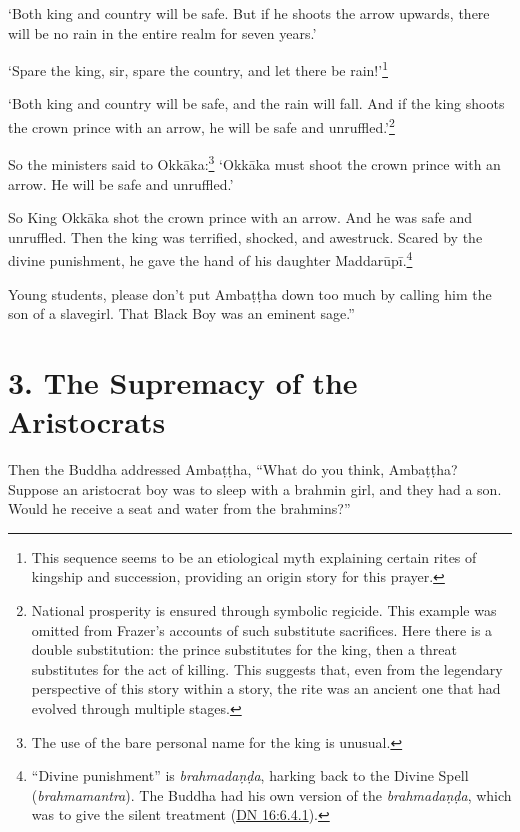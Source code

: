 \documentclass[12pt,openany]{book}%
\begin{document}
‘Both king and country will be safe. But if he shoots the arrow upwards, there will be no rain in the entire realm for seven years.’ 

‘Spare the king, sir, spare the country, and let there be rain!’\footnote{This sequence seems to be an etiological myth explaining certain rites of kingship and succession, providing an origin story for this prayer. } 

‘Both king and country will be safe, and the rain will fall. And if the king shoots the crown prince with an arrow, he will be safe and unruffled.’\footnote{National prosperity is ensured through symbolic regicide. This example was omitted from Frazer’s accounts of such substitute sacrifices. Here there is a double substitution: the prince substitutes for the king, then a threat substitutes for the act of killing. This suggests that, even from the legendary perspective of this story within a story, the rite was an ancient one that had evolved through multiple stages. } 

So the ministers said to \textsanskrit{Okkāka}:\footnote{The use of the bare personal name for the king is unusual. } ‘\textsanskrit{Okkāka} must shoot the crown prince with an arrow. He will be safe and unruffled.’ 

So King \textsanskrit{Okkāka} shot the crown prince with an arrow. And he was safe and unruffled. Then the king was terrified, shocked, and awestruck. Scared by the divine punishment, he gave the hand of his daughter \textsanskrit{Maddarūpī}.\footnote{“Divine punishment” is \textit{\textsanskrit{brahmadaṇḍa}}, harking back to the Divine Spell (\textit{brahmamantra}). The Buddha had his own version of the \textit{\textsanskrit{brahmadaṇḍa}}, which was to give the silent treatment (\href{https://suttacentral.net/dn16/en/sujato\#6.4.1}{DN 16:6.4.1}). } 

Young students, please don’t put \textsanskrit{Ambaṭṭha} down too much by calling him the son of a slavegirl. That Black Boy was an eminent sage.” 

\section*{3. The Supremacy of the Aristocrats }

Then the Buddha addressed \textsanskrit{Ambaṭṭha}, “What do you think, \textsanskrit{Ambaṭṭha}? Suppose an aristocrat boy was to sleep with a brahmin girl, and they had a son. Would he receive a seat and water from the brahmins?” 
\end{document}

